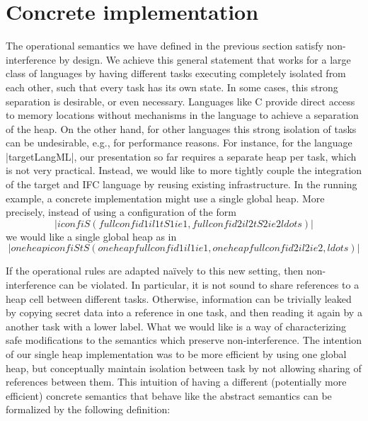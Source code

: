 \section{Concrete implementation}
\label{sec:concrete}

\newcommand{\con}[1]{\ensuremath{{\color{red} #1}}}
\newcommand{\abs}[1]{\ensuremath{{\color{blue} #1}}}

The operational semantics we have defined in the previous section
satisfy non-interference by design.
We achieve this general statement that works for a large class of
languages by having different tasks executing completely isolated from
each other, such that every task has its own state.
In some cases, this strong separation is desirable, or even necessary.
Languages like C provide direct access to memory locations without
mechanisms in the language to achieve a separation of the heap.
On the other hand, for other languages this
strong isolation of tasks can be
undesirable, e.g., for performance reasons.
For instance, for the language |targetLangML|, our presentation so far
requires a separate heap per task, which is not very practical.
Instead, we would like to
more tightly couple the integration of the target and IFC
language by reusing existing infrastructure.  In the running example,
a concrete implementation might use a single global heap.
More precisely, instead of using a configuration of the form
\[|iconf iS (fullconf id1 il1 tS1 ie1, fullconf id2 il2 tS2 ie2 ldots)|\]
we would like a single global heap as in
\[|oneheapiconf iS tS (oneheapfullconf id1 il1 ie1, oneheapfullconf id2 il2 ie2, ldots)|\]

If the operational rules are adapted na\"ively to this new setting,
then non-interference can be violated.  In particular, it is not
sound to share references to a heap cell between different tasks.
Otherwise, information can be trivially leaked by copying
secret data into a reference in one task, and then
reading it again by a another task with a lower label.
What we would like is a way of characterizing safe modifications to
the semantics which preserve non-interference.
The intention of our single heap implementation was to be more efficient
by using one global heap, but conceptually maintain isolation between
task by not allowing sharing of references between them.
This intuition of having a different (potentially more efficient)
concrete semantics that behave like the abstract semantics
can be formalized by the following definition:


